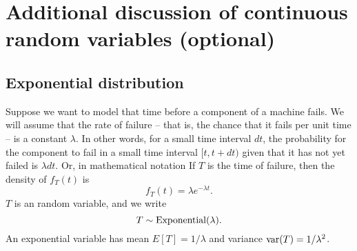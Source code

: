 \appendix

 \section{Additional discussion of continuous random variables (optional)}


\subsection{Exponential distribution}
 Suppose we want to model that time before a component of a machine fails. We will assume that the rate of failure -- that is, the chance that it fails per unit time -- is a constant $\lambda$. In other words, for a small time interval $dt$, the probability for the component to fail in a small time interval $[t,t+dt)$ given that it has not yet failed is $\lambda dt$. Or, in mathematical notation 
 If $T$ is the time of failure, then the density of $f_T(t)$ is 
\begin{equation*}
f_T(t) = \lambda e^{-\lambda t}.
\end{equation*}
$T$ is an  random variable, and we write
\begin{equation*}
T \sim {\rm Exponential}(\lambda).
\end{equation*}
An exponential variable has mean $E[T] = 1/\lambda$ and variance ${\rm var}(T) = 1/\lambda^2$. 



